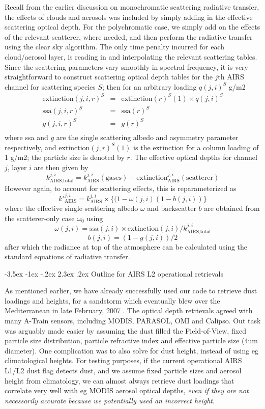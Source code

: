 \documentclass[11pt]{article}
\makeatletter
\renewcommand{\section}{\@startsection {section}{1}{\z@}%
                                   {-3.5ex \@plus -1ex \@minus -.2ex}%
                                   {2.3ex \@plus.2ex}%
                                   {\reset@font\large\bfseries}}
\makeatother
\begin{document}
Recall from the earlier discussion on monochromatic scattering
radiative transfer, the effects of clouds and aerosols was included by
simply adding in the effective scattering optical depth. For the
polychromatic case, we simply add on the effects of the relevant
scatterer, where needed, and then perform the radiative transfer using
the clear sky algorithm. The only time penalty incurred for each
cloud/aerosol layer, is reading in and interpolating the relevant
scattering tables. Since the scattering parameters vary smoothly in
spectral frequency, it is very straightforward to construct scattering
optical depth tables for the $j$th AIRS channel for scattering species
$S$; then for an arbitrary loading $q(j,i)^{S}$ g/m2
\begin{eqnarray*}
  \text{extinction}(j,i,r)^{S} & = &  \text{extinction}(r)^{S}(1) \times  q(j,i)^{S} \\
  \text{ssa}(j,i,r)^{S} & = &  \text{ssa}(r)^{S} \\
  g(j,i,r)^{S} & = &  g(r)^{S} \\
\end{eqnarray*}
where ssa and $g$ are the single scattering albedo and asymmetry
parameter respectively, and $\text{extinction}(j,r)^{S}(1)$ is the
extinction for a column loading of 1 g/m2; the particle size is
denoted by $r$. The effective optical depths for channel $j$, layer
$i$ are then given by
\[
k_{\text{AIRS,total}}^{j,i} = k_{\text{AIRS}}^{j,i}(\text{gases}) +
\text{extinction}_{\text{AIRS}}^{j,i}(\text{scatterer})
\]
However again, to account for scattering effects, this is
reparameterized as
\[
k\prime_{\text{AIRS}}^{j,i} = k_{\text{AIRS}}^{j,i} \times \{
(1-\omega(j,i) (1-b(j,i)) \}
\]
where the effective single scattering albedo $\omega$ and backscatter
$b$ are obtained from the scatterer-only case $\omega_{0}$ using
\[
\omega(j,i) = \text{ssa}(j,i) \times
\text{extinction}(j,i)/k_{\text{AIRS,total}}^{j,i}
\]
\[
b(j,i) = (1 - g(j,i))/2
\]
after which the radiance at top of the atmosphere can be calculated
using the standard equations of radiative transfer.

\section{Outline for AIRS L2 operational retrievals}

As mentioned earlier, we have already successfully used our code to
retrieve dust loadings and heights, for a sandstorm which eventually
blew over the Mediterranean in late February, 2007 \cite{mac:10}. The
optical depth retrievals agreed with many A-Train sensors, including
MODIS, PARASOL, OMI and Calipso. Out task was arguably made easier by
assuming the dust filled the Field-of-View, fixed particle size
distribution, particle refractive index and effective particle size
(4um diameter). One complication was to also solve for dust height,
instead of using eg climatological heights. For testing purposes, if
the current operational AIRS L1/L2 dust flag detects dust, and we
assume fixed particle sizes and aerosol height from climatology, we
can almost always retrieve dust loadings that correlate very well with
eg MODIS aerosol optical depths, \emph{even if they are not necessarily
  accurate because we potentially used an incorrect height}.
\end{document}
